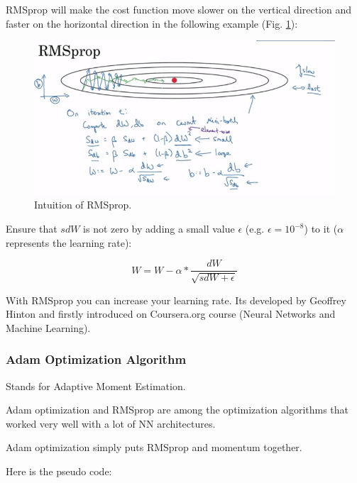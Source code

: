 RMSprop will make the cost function move slower on the vertical direction and faster on the horizontal direction in the following example (Fig. \ref{rmsprop}):

\begin{figure}[!htbp]
    \centering
    \includegraphics[width=1.0\textwidth, trim={0 0 0 33}, clip]{img/c2/RMSprop.png}
    \caption{Intuition of RMSprop.}
    \label{rmsprop}
\end{figure}

Ensure that $sdW$ is not zero by adding a small value $\epsilon$ (e.g. $\epsilon=10^{-8}$) to it ($\alpha$ represents the learning rate):

\begin{equation}
    W = W - \alpha * \frac{dW}{\sqrt{sdW + \epsilon}}
\end{equation}

With RMSprop you can increase your learning rate. Its developed by Geoffrey Hinton and firstly introduced on Coursera.org course (Neural Networks and Machine Learning).

\subsubsection{Adam Optimization Algorithm}
Stands for Adaptive Moment Estimation.

Adam optimization and RMSprop are among the optimization algorithms that worked very well with a lot of NN architectures.

Adam optimization simply puts RMSprop and momentum together.

Here is the pseudo code:

